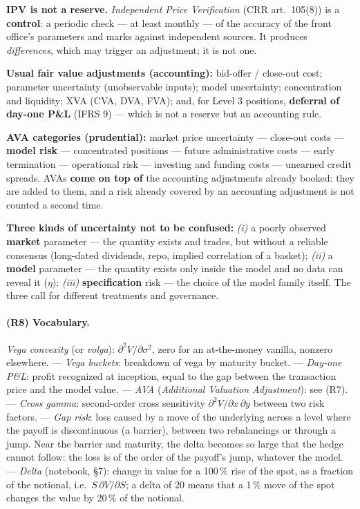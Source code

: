 \documentclass[11pt,a4paper]{article}
\begin{document}
\textbf{IPV is not a reserve.} \emph{Independent Price Verification} (CRR art.\ 105(8)) is a \textbf{control}: a periodic
check --- at least monthly --- of the accuracy of the front office's parameters and marks against
independent sources. It produces \emph{differences}, which may trigger an adjustment; it is not one.

\textbf{Usual fair value adjustments (accounting):} bid-offer / close-out cost; parameter uncertainty
(unobservable inputs); model uncertainty; concentration and liquidity; XVA (CVA, DVA, FVA); and,
for Level 3 positions, \textbf{deferral of day-one P\&L} (IFRS 9) --- which is not a reserve but an accounting
rule.

\textbf{AVA categories (prudential):} market price uncertainty --- close-out costs --- \textbf{model risk} ---
concentrated positions --- future administrative costs --- early termination --- operational risk ---
investing and funding costs --- unearned credit spreads. AVAs \textbf{come on top of} the accounting
adjustments already booked: they are added to them, and a risk already covered by an accounting
adjustment is not counted a second time.

\textbf{Three kinds of uncertainty not to be confused:} \emph{(i)} a poorly observed \textbf{market} parameter ---
the quantity exists and trades, but without a reliable consensus (long-dated dividends, repo, implied
correlation of a basket); \emph{(ii)} a \textbf{model} parameter --- the quantity exists only inside the model and no
data can reveal it ($\eta$); \emph{(iii)} \textbf{specification} risk --- the choice of the model family itself. The three call
for different treatments and governance.

\paragraph{(R8) Vocabulary.} \emph{Vega convexity} (or \emph{volga}): $\partial^2 V/\partial\sigma^2$, zero for an at-the-money vanilla, nonzero
elsewhere. --- \emph{Vega buckets}: breakdown of vega by maturity bucket. --- \emph{Day-one P\&L}: profit recognized
at inception, equal to the gap between the transaction price and the model value. --- \emph{AVA} (\emph{Additional
Valuation Adjustment}): see (R7). --- \emph{Cross gamma}: second-order cross sensitivity $\partial^2 V/\partial x\,\partial y$ between
two risk factors. --- \emph{Gap risk}: loss caused by a move of the underlying across a level where the payoff is
discontinuous (a barrier), between two rebalancings or through a jump. Near the barrier and maturity,
the delta becomes so large that the hedge cannot follow: the loss is of the order of the payoff's jump,
whatever the model. --- \emph{Delta} (notebook, \S7): change in value for a 100\,\% rise of the spot, as a fraction
of the notional, i.e.\ $S\,\partial V/\partial S$; a delta of 20 means that a 1\,\% move of the spot changes the value by
20\,\% of the notional.
\end{document}
